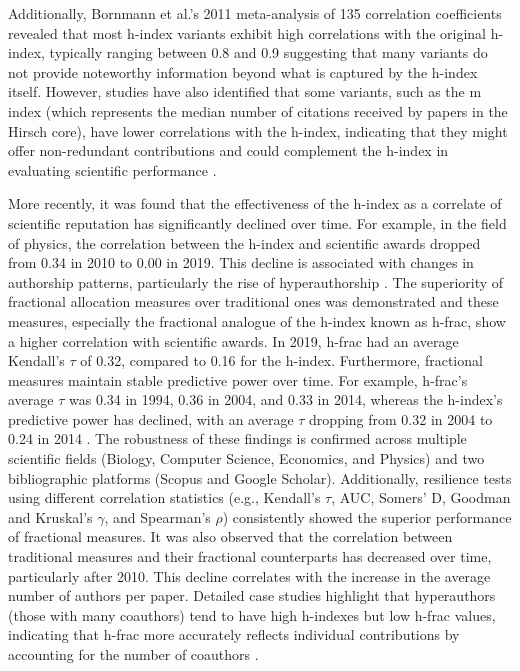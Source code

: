 Additionally, Bornmann et al.'s 2011 meta-analysis of 135 correlation
coefficients revealed that most h-index variants exhibit high correlations with
the original h-index, typically ranging between 0.8 and 0.9 suggesting that
many variants do not provide noteworthy information beyond what is captured by
the h-index itself. However, studies have also identified that some variants,
such as the m index (which represents the median number of citations received
by papers in the Hirsch core), have lower correlations with the h-index,
indicating that they might offer non-redundant contributions and could
complement the h-index in evaluating scientific performance
\cite{bornmann2011multilevel, bornmann2008are}.

More recently, it was found that the effectiveness of the h-index as a
correlate of scientific reputation has significantly declined over time. For
example, in the field of physics, the correlation between the h-index and
scientific awards dropped from 0.34 in 2010 to 0.00 in 2019. This decline is
associated with changes in authorship patterns, particularly the rise of
hyperauthorship \cite{koltun2021h}. The superiority of fractional allocation
measures over traditional ones was demonstrated and these measures, especially
the fractional analogue of the h-index known as h-frac, show a higher
correlation with scientific awards. In 2019, h-frac had an average Kendall’s
$\tau$ of 0.32, compared to 0.16 for the h-index. Furthermore, fractional
measures maintain stable predictive power over time. For example, h-frac's
average $\tau$ was 0.34 in 1994, 0.36 in 2004, and 0.33 in 2014, whereas the
h-index's predictive power has declined, with an average $\tau$ dropping from
0.32 in 2004 to 0.24 in 2014 \cite{koltun2021h}. The robustness of these
findings is confirmed across multiple scientific fields (Biology, Computer
Science, Economics, and Physics) and two bibliographic platforms (Scopus and
Google Scholar). Additionally, resilience tests using different correlation
statistics (e.g., Kendall’s $\tau$, AUC, Somers’ D, Goodman and Kruskal’s
$\gamma$, and Spearman’s $\rho$) consistently showed the superior performance
of fractional measures. It was also observed that the correlation between
traditional measures and their fractional counterparts has decreased over time,
particularly after 2010. This decline correlates with the increase in the
average number of authors per paper. Detailed case studies highlight that
hyperauthors (those with many coauthors) tend to have high h-indexes but low
h-frac values, indicating that h-frac more accurately reflects individual
contributions by accounting for the number of coauthors \cite{koltun2021h}.

